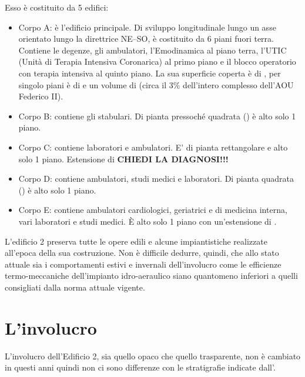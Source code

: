 Esso è costituito da 5 edifici:
\begin{itemize}
	\item Corpo A: è l'edificio principale. Di sviluppo longitudinale lungo un asse orientato lungo la direttrice NE--SO, è costituito da 6 piani fuori terra. Contiene le degenze, gli ambulatori, l'Emodinamica al piano terra, l'UTIC (Unità di Terapia Intensiva Coronarica) al primo piano e il blocco operatorio con terapia intensiva al quinto piano. La sua superficie coperta è di , per singolo piani è di  e un volume di  (circa il 3\% dell'intero complesso dell'AOU Federico II).
	\item Corpo B: contiene gli stabulari. Di pianta pressoché quadrata () è alto solo 1 piano. 
	\item Corpo C: contiene laboratori e ambulatori. E' di pianta rettangolare e alto solo 1 piano. Estensione di  \textbf{CHIEDI LA DIAGNOSI!!!}
	\item Corpo D: contiene ambulatori, studi medici e laboratori. Di pianta quadrata () è alto solo 1 piano. 
	\item Corpo E: contiene ambulatori cardiologici, geriatrici e di medicina interna, vari laboratori e studi medici. È alto solo 1 piano con un'estensione di .
\end{itemize}

L'edificio 2 preserva tutte le opere edili e alcune impiantistiche realizzate all'epoca della sua costruzione. Non è difficile dedurre, quindi, che allo stato attuale sia i comportamenti estivi e invernali dell'involucro come le efficienze termo-meccaniche dell'impianto idro-aeraulico siano quantomeno inferiori a quelli consigliati dalla norma attuale vigente. 

\section{L'involucro}
L'involucro dell'Edificio 2, sia quello opaco che quello trasparente, non è cambiato in questi anni quindi non ci sono differenze con le stratigrafie indicate dall'.

